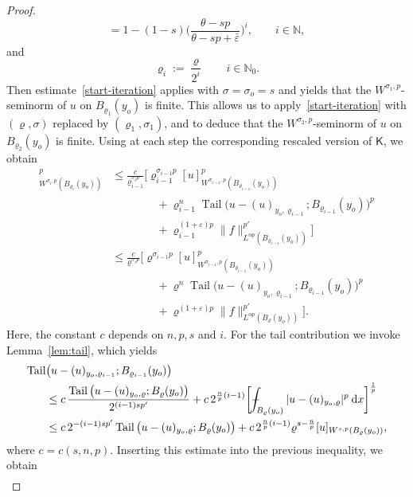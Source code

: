 \documentclass[10pt,letterpaper]{amsart}
\theoremstyle{definition}
\numberwithin{theorem}{section}
\numberwithin{equation}{section}
\newcommand{\1}{\ensuremath{\mathds{1}}}
\newcommand\sfK{{\boldsymbol{\mathsf K}}}
\def\Xint#1{\mathchoice
    {\XXint\displaystyle\textstyle{#1}}%
    {\XXint\textstyle\scriptstyle{#1}}%
    {\XXint\scriptstyle\scriptscriptstyle{#1}}%
    {\XXint\scriptscriptstyle\scriptscriptstyle{#1}}%
    \!\int}
\def\XXint#1#2#3{\setbox0=\hbox{$#1{#2#3}{\int}$}
    \vcenter{\hbox{$#2#3$}}\kern-0.5\wd0}
\def\bint{\Xint-}
\renewcommand{\epsilon}{\varepsilon}
\renewcommand{\rho}{\varrho}
\renewcommand{\epsilon}{\varepsilon}
\renewcommand{\rho}{\varrho}
\renewcommand{\d}{\:\! \mathrm{d}}
\DeclareMathOperator{\Tail}{Tail}
\numberwithin{equation}{section}
\begin{document}
\begin{proof}
\[    = 1-(1-s)\Big(\frac{\theta-sp}{\theta-sp+\bar\epsilon}\Big)^i, \qquad i\in\mathbb{N},
\]
and 
\[
    \rho_i:=\frac{\rho}{2^i}
    \qquad i\in\mathbb{N}_0.
\]
Then estimate~\eqref{start-iteration} applies with \(\sigma=\sigma_o=s\)
and yields that the \(W^{\sigma_1,p}\)-seminorm of \(u\) on
\(B_{\rho_1}(y_o)\) is finite.
This allows us to apply~\eqref{start-iteration} with
\((\rho,\sigma)\) replaced by \((\rho_1,\sigma_1)\), and to deduce
that the \(W^{\sigma_2,p}\)-seminorm of \(u\) on \(B_{\rho_2}(y_o)\) is
finite.
Using at each step the corresponding
rescaled version of \(\sfK\), we obtain
\begin{align*}
    [u]_{W^{\sigma_i,p}(B_{\rho_i}(y_o))}^p
    &\le
    \frac{c}{\rho_{i-1}^{\sigma_i p}}
    \Big[
        \rho_{i-1}^{\sigma_{i-1} p}
        [u]_{W^{\sigma_{i-1},p}(B_{\rho_{i-1}}(y_o))}^p \\
    &\qquad\qquad + 
        \rho_{i-1}^n
        \Tail\big(u-(u)_{y_o,\rho_{i-1}};B_{\rho_{i-1}}(y_o)\big)^p \\
    &\qquad\qquad + 
    \rho_{i-1}^{(1+\varepsilon)p}
        \|f\|_{L^{\alpha p}(B_{\rho_{i-1}}(y_o))}^{p'}
    \Big] \\
    &\le
    \frac{c}{\rho^{\sigma_i p}}
    \Big[
        \rho^{\sigma_{i-1} p}
        [u]_{W^{\sigma_{i-1},p}(B_{\rho_{i-1}}(y_o))}^p \\
    &\qquad\qquad + 
        \rho^n \Tail\big(u-(u)_{y_o,\rho_{i-1}};B_{\rho_{i-1}}(y_o)\big)^p \\
    &\qquad\qquad + 
        \rho^{(1+\varepsilon)p}
        \|f\|_{L^{\alpha p}(B_{\rho}(y_o))}^{p'}
    \Big].
\end{align*}
Here, the constant \(c\) depends on \(n,p,s\) and \(i\). 
For the tail contribution we invoke
Lemma~\ref{lem:tail}, which yields
\begin{align}\label{est-1}
    \Tail&\big(u - (u)_{y_o,\rho_{i-1}};B_{\rho_{i-1}}(y_o)\big) \nonumber\\
    &\leq 
    c\, \frac{\Tail \big(u-(u)_{y_o,\rho};B_{\rho}(y_o)\big)}{2^{(i-1)sp'}}
    +
    c\, 2^{\frac{n}{p}(i-1)} \bigg[ \bint_{B_{\rho}(y_o)} |u-(u)_{y_o,\rho}|^p \, \d x \bigg]^\frac{1}{p} \nonumber\\
    &\leq 
    c\, 2^{-(i-1)sp'}
    \Tail \big(u-(u)_{y_o,\rho};B_{\rho}(y_o)\big) +
    c\, 2^{\frac{n}{p}(i-1)}\rho^{s-\frac{n}{p}} [u]_{W^{s,p}(B_{\rho}(y_o))} ,
\end{align}
where $c = c(s,n,p)$. 
Inserting this estimate into the previous inequality, we obtain
\begin{align*}

\end{align*}
\end{proof}
\end{document}
